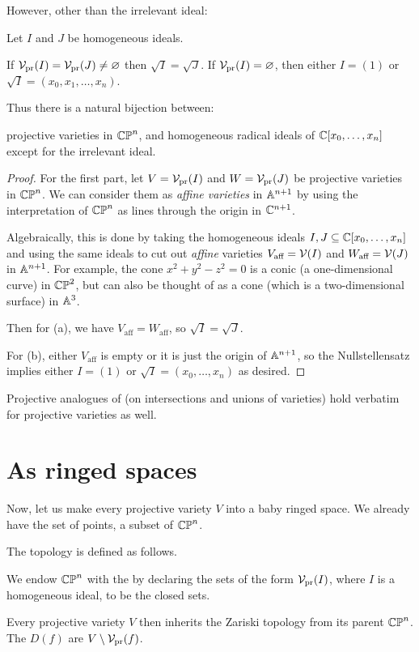 However, other than the irrelevant ideal:
\begin{theorem}
	Let $I$ and $J$ be homogeneous ideals.
	\begin{enumerate}[(a)]
		\ii If $\mathcal V_{\text{pr}}(I) = \mathcal V_{\text{pr}}(J) \neq \varnothing$ then $\sqrt I = \sqrt J$.
		\ii If $\mathcal V_{\text{pr}}(I) = \varnothing$, then either $I = (1)$
		or $\sqrt I = (x_0, x_1, \dots, x_n)$.
	\end{enumerate}
	Thus there is a natural bijection between:
	\begin{itemize}
		\ii projective varieties in $\mathbb{CP}^n$, and
		\ii homogeneous radical ideals of $\mathbb C[x_0, \dots, x_n]$
		except for the irrelevant ideal.
	\end{itemize}
\end{theorem}
\begin{proof}
	For the first part, let $V = \mathcal V_{\text{pr}}(I)$ and $W = \mathcal V_{\text{pr}}(J)$
	be projective varieties in $\mathbb{CP}^n$.
	We can consider them as \emph{affine varieties} in $\mathbb A^{n+1}$
	by using the interpretation of $\mathbb{CP}^n$
	as lines through the origin in $\mathbb C^{n+1}$.

	Algebraically, this is done by taking the homogeneous ideals
	$I, J \subseteq \mathbb C[x_0, \dots, x_n]$
	and using the same ideals to cut out \emph{affine} varieties
	$V_{\text{aff}} = \mathcal V(I)$ and $W_{\text{aff}} = \mathcal V(J)$ in $\mathbb A^{n+1}$.
	For example, the cone $x^2+y^2-z^2=0$ is a conic (a one-dimensional curve)
	in $\mathbb{CP}^2$, but can also be thought of as a cone
	(which is a two-dimensional surface) in $\mathbb A^3$.

	Then for (a), we have $V_{\text{aff}} = W_{\text{aff}}$,
	so $\sqrt I = \sqrt J$.

	For (b), either $V_{\text{aff}}$ is empty
	or it is just the origin of $\mathbb A^{n+1}$,
	so the Nullstellensatz implies either $I = (1)$
	or $\sqrt I = (x_0, \dots, x_n)$ as desired.
\end{proof}
Projective analogues of 
(on intersections and unions of varieties) hold verbatim
for projective varieties as well.


\section{As ringed spaces}
Now, let us make every projective variety $V$ into a baby ringed space.
We already have the set of points, a subset of $\mathbb{CP}^n$.

The topology is defined as follows.
\begin{definition}
	We endow $\mathbb{CP}^n$ with the 
	by declaring the sets of the form $\mathcal V_{\text{pr}}(I)$,
	where $I$ is a homogeneous ideal, to be the closed sets.

	Every projective variety $V$ then inherits the Zariski
	topology from its parent $\mathbb{CP}^n$.
	The  $D(f)$ are $V \setminus \mathcal V_{\text{pr}}(f)$.
\end{definition}

